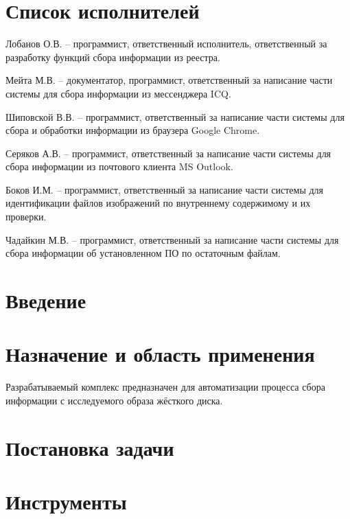 


 
 
 
 \newpage
 \section*{Список исполнителей}
 
Лобанов О.В. -- программист, ответственный исполнитель, ответственный за разработку функций сбора информации из реестра. 
 
Мейта М.В. -- документатор, программист, ответственный за написание части системы для сбора информации из мессенджера ICQ.

Шиповской В.В. -- программист, ответственный за написание части системы для сбора и обработки информации из браузера Google Chrome.

Серяков А.В. -- программист, ответственный за написание части системы для сбора информации из почтового клиента MS Outlook.

Боков И.М. -- программист, ответственный за написание части системы для идентификации файлов изображений по внутреннему содержимому и их проверки.

Чадайкин М.В. -- программист, ответственный за написание части системы для сбора информации об установленном ПО по остаточным файлам.

 
 \newpage
 \tableofcontents

 \newpage
 \section*{Введение}
 

 \section{Назначение и область применения}
Разрабатываемый комплекс предназначен для автоматизации процесса сбора информации с исследуемого образа жёсткого диска.
\section{Постановка задачи}
\setcounter{figure}{0}

\section{Инструменты}
\setcounter{figure}{0}
